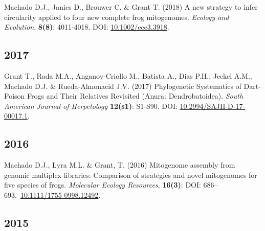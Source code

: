 \documentclass[11pt, letterpaper, sans]{moderncv}
\begin{document}
    {\setlength{\parskip}{.5em}\renewcommand{\baselinestretch}{2.0}\begin{hangparas}{.25in}{1}
		Machado D.J., Janies D., Brouwer C. \& Grant T. (2018) A new strategy to infer circularity applied to four new complete frog mitogenomes. \emph{Ecology and Evolution}, \textbf{8(8)}: 4011-4018. DOI: \href{http://doi.wiley.com/10.1002/ece3.3918}{10.1002/ece3.3918}.
	\end{hangparas}}


\subsection{2017}

    {\setlength{\parskip}{.5em}\renewcommand{\baselinestretch}{2.0}\begin{hangparas}{.25in}{1}
		Grant T., Rada M.A., Anganoy-Criollo M., Batista A., Dias P.H., Jeckel A.M., Machado D.J. \& Rueda-Almonacid J.V. (2017) Phylogenetic Systematics of Dart-Poison Frogs and Their Relatives Revisited (Anura: Dendrobatoidea). \emph{South American Journal of Herpetology} \textbf{12(s1)}: S1-S90. DOI: \href{http://www.bioone.org/doi/10.2994/SAJH-D-17-00017.1}{10.2994/SAJH-D-17-00017.1}.
	\end{hangparas}}

\clearpage


\subsection{2016}

    {\setlength{\parskip}{.5em}\renewcommand{\baselinestretch}{2.0}\begin{hangparas}{.25in}{1}
		Machado D.J., Lyra M.L. \& Grant, T. (2016) Mitogenome assembly from genomic multiplex libraries: Comparison of strategies and novel mitogenomes for five species of frogs. \emph{Molecular Ecology Resources}, \textbf{16(3)}: DOI: 686--693.~\href{https://doi.org/10.1111/1755-0998.12492}{10.1111/1755-0998.12492}.
	\end{hangparas}}


\subsection{2015}
\end{document}
